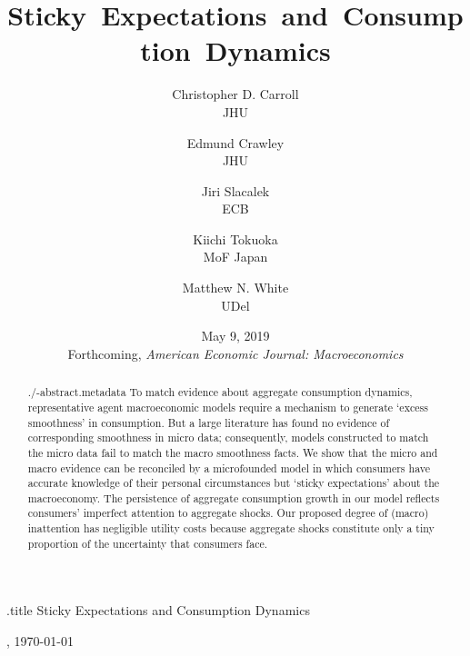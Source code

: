 \documentclass[titlepage]{\econtex}
\begin{document}

\begin{adjustwidth}{-1em}{-1em}

\begin{verbatimwrite}{\jobname.title}
Sticky Expectations and Consumption Dynamics
\end{verbatimwrite}

\hfill{\tiny \jobname, \today}

\title{Sticky~Expectations~and~Consumption~Dynamics}

{
\author{
  Christopher D. Carroll\authNum \\ {\small JHU}
  \and
  Edmund Crawley\authNum   \\ {\small JHU}
  \and
  Jiri Slacalek\authNum    \\ {\small ECB}
  \and
  Kiichi Tokuoka\authNum   \\ {\small MoF Japan}
  \and
  Matthew N. White\authNum \\ {\small UDel}
}
} 



\date{May 9, 2019 \\ \large{Forthcoming, \textit{American Economic Journal: Macroeconomics}}}
\maketitle

\hypertarget{Abstract}{} 
\begin{abstract}
  \begin{verbatimwrite}{./\jobname-abstract.metadata}
   To match evidence about aggregate consumption dynamics, representative agent macroeconomic models require a mechanism to generate `excess smoothness' in consumption.   But a large literature has found no evidence of corresponding smoothness in micro data; consequently, models constructed to match the micro data fail to match the macro smoothness facts.  We show that the micro and macro evidence can be reconciled by a microfounded model in which consumers have accurate knowledge of their personal circumstances but `sticky expectations' about the macroeconomy.  The persistence of aggregate consumption growth in our model reflects consumers' imperfect attention to aggregate shocks. Our proposed degree of (macro) inattention has negligible utility costs because aggregate shocks constitute only a tiny proportion of the uncertainty that consumers face.
  \end{verbatimwrite}
  
\end{abstract}


\end{adjustwidth}
\end{document}
